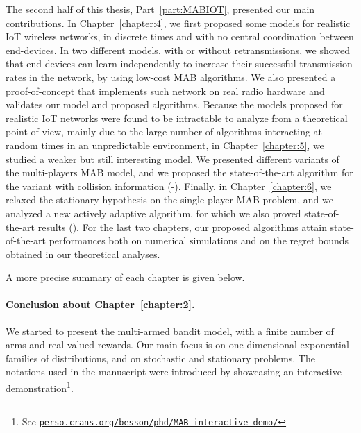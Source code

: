 The second half of this thesis, Part~\ref{part:MABIOT}, presented our main contributions.
In Chapter~\ref{chapter:4}, we first proposed some models for realistic IoT wireless networks, in discrete times and with no central coordination between end-devices.
In two different models, with or without retransmissions, we showed that end-devices can learn independently to increase their successful transmission rates in the network, by using low-cost MAB algorithms.
We also presented a proof-of-concept that implements such network on real radio hardware and validates our model and proposed algorithms.
Because the models proposed for realistic IoT networks were found to be intractable to analyze from a theoretical point of view, mainly due to the large number of algorithms interacting at random times in an unpredictable environment,
in Chapter~\ref{chapter:5}, we studied a weaker but still interesting model.
We presented different variants of the multi-players MAB model, and we proposed the state-of-the-art algorithm for the variant with collision information (\MCTopM-\klUCB).
Finally, in Chapter~\ref{chapter:6}, we relaxed the stationary hypothesis on the single-player MAB problem, and we analyzed a new actively adaptive algorithm, for which we also proved state-of-the-art results (\GLRklUCB).
%
For the last two chapters, our proposed algorithms attain state-of-the-art performances both on numerical simulations and on the regret bounds obtained in our theoretical analyses.

A more precise summary of each chapter is given below.




\paragraph{Conclusion about \textbf{Chapter~\ref{chapter:2}}.}

We started to present the multi-armed bandit model, with a finite number of arms and real-valued rewards.
Our main focus is on one-dimensional exponential families of distributions, and on stochastic and stationary problems.
The notations used in the manuscript were introduced by showcasing an interactive demonstration\footnote{See \href{https://perso.crans.org/besson/phd/MAB\_interactive\_demo/}{\texttt{perso.crans.org/besson/phd/MAB\_interactive\_demo/}}}.


